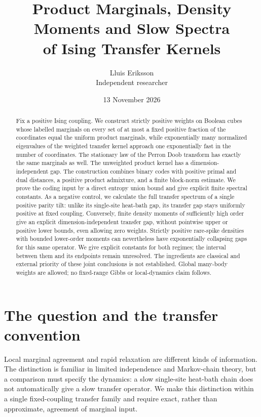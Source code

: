 \documentclass[11pt]{article}
\title{Product Marginals, Density Moments and Slow Spectra\\of Ising Transfer Kernels}
\author{Lluis Eriksson\\\small Independent researcher}
\date{13 November 2026}
\begin{document}
\maketitle
\begin{abstract}
Fix a positive Ising coupling. We construct strictly positive weights on
Boolean cubes whose labelled marginals on every set of at most a fixed
positive fraction of the coordinates equal the uniform product marginals,
while exponentially many normalized eigenvalues of the weighted transfer
kernel approach one exponentially fast in the number of coordinates.
The stationary law of the Perron Doob transform has exactly the same
marginals as well. The unweighted product kernel has a dimension-independent
gap. The construction combines binary codes with positive primal and dual
distances, a positive product admixture, and a finite block-norm estimate.
We prove the coding input by a direct entropy union bound and give explicit
finite spectral constants. As a negative control, we calculate the full
transfer spectrum of a single positive parity tilt: unlike its single-site
heat-bath gap, its transfer gap stays uniformly positive at fixed coupling.
Conversely, finite density moments of sufficiently high order give an
explicit dimension-independent transfer gap, without pointwise upper or
positive lower bounds, even allowing zero weights. Strictly positive
rare-spike densities with bounded lower-order moments can nevertheless
have exponentially collapsing gaps for this same operator. We give
explicit constants for both regimes; the interval between them and its
endpoints remain unresolved. The ingredients are classical and external
priority of these joint conclusions is not established. Global many-body
weights are allowed; no fixed-range Gibbs or local-dynamics claim follows.
\end{abstract}

\section{The question and the transfer convention}
Local marginal agreement and rapid relaxation are different kinds of
information. The distinction is familiar in limited independence and
Markov-chain theory, but a comparison must specify the dynamics: a slow
single-site heat-bath chain does not automatically give a slow transfer
operator. We make this distinction within a single fixed-coupling transfer
family and require exact, rather than approximate, agreement of marginal
input.
\end{document}
